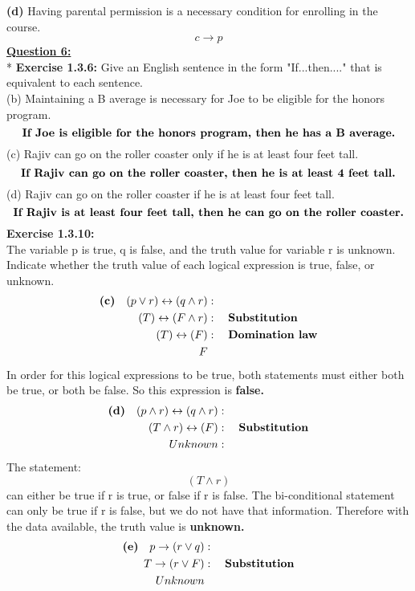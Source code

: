 \documentclass[12pt, letterpaper, twoside]{article}
\begin{document}
\noindent\textbf{(d)} Having parental permission is a necessary condition for enrolling in the course.
\[c \to p\]
\newpage
\noindent \underline{\textbf{Question 6:}}\\*
\textbf{Exercise 1.3.6:}
Give an English sentence in the form "If...then...." that is equivalent to each sentence.\\
\break
(b)	Maintaining a B average is necessary for Joe to be eligible for the honors program.
\[ \text{\textbf{If Joe is eligible for the honors program, then he has a B average.}}\]
\break
(c)	Rajiv can go on the roller coaster only if he is at least four feet tall.
\[ \text{\textbf{If Rajiv can go on the roller coaster, then he is at least 4 feet tall.}}\]
\break
(d)	Rajiv can go on the roller coaster if he is at least four feet tall.
\[ \text{\textbf{If Rajiv is at least four feet tall, then he can go on the roller coaster.}}\]
\break
\textbf{Exercise 1.3.10:}\\
The variable p is true, q is false, and the truth value for variable r is unknown. Indicate whether the truth value of each logical expression is true, false, or unknown.
\begin{align*}
\text{\textbf{(c)}} \quad (p \lor r) \leftrightarrow  (q \land r)     &: \quad\\
(T) \leftrightarrow (F \land r)     &: \quad \text{\textbf{Substitution}}\\
(T) \leftrightarrow (F)     &: \quad \text{\textbf{Domination law}}\\
F\\
\end{align*}
In order for this logical expressions to be true, both statements must either both be true, or both be false. So this expression is \textbf{false.}\\
\begin{align*}
\text{\textbf{(d)}} \quad (p \land r) \leftrightarrow (q \land r)     &: \quad	\\
(T \land r) \leftrightarrow (F)     &: \quad \text{\textbf{Substitution}}		\\
Unknown     &: \quad\\
\end{align*}
The statement: \[(T \land r)\] can either be true if r is true, or false if r is false. The bi-conditional statement can only be true if r is false, but we do not have that information. Therefore with the data available, the truth value is \textbf{unknown.}\\
\newpage
\begin{align*}
\text{\textbf{(e)}} \quad p \to (r \lor q)     &: \quad\\
T \to (r \lor F)     &: \quad \text{\textbf{Substitution}}\\
Unknown\\
\end{align*}
\end{document}
